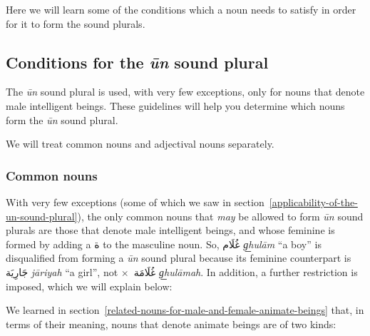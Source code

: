 \documentclass[
  10pt,
]{book}
\begin{document}
Here we will learn some of the conditions which a noun needs to satisfy in order for it to form the sound plurals.

\subsection{\texorpdfstring{Conditions for the \emph{ūn} sound plural}{Conditions for the ūn sound plural}}\label{conditions-for-the-un-sound-plural}

The \emph{ūn} sound plural is used, with very few exceptions, only for nouns that denote male intelligent beings. These guidelines will help you determine which nouns form the \emph{ūn} sound plural.

We will treat common nouns and adjectival nouns separately.

\subsubsection{Common nouns}\label{common-nouns}

With very few exceptions (some of which we saw in
section~\ref{applicability-of-the-un-sound-plural}),
the only common nouns that \emph{may} be allowed to form \emph{ūn} sound plurals are those that denote male intelligent beings, and whose feminine is formed by adding a \foreignlanguage{arabic}{ة} to the masculine noun. So, \foreignlanguage{arabic}{غُلَام} \emph{g͟hulām} \enquote{a boy} is disqualified from forming a \emph{ūn} sound plural because its feminine counterpart is \foreignlanguage{arabic}{جَارِيَة} \emph{jāriyah} \enquote{a girl}, not \(\times\)~\foreignlanguage{arabic}{غُلَامَة} \emph{g͟hulāmah}. In addition, a further restriction is imposed, which we will explain below:

We learned in section~\ref{related-nouns-for-male-and-female-animate-beings} that, in terms of their meaning, nouns that denote animate beings are of two kinds:
\end{document}
